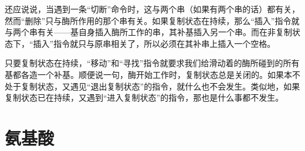还应说说，当遇到一条“切断”命令时，这与两个串（如果有两个串的话）都有关，然而“删除”只与酶所作用的那个串有关。如果复制状态在持续，那么“插入”指令就与两个串有关——基自身插入酶所工作的串，其补基插入另一个串。而在非复制状态下，“插入”指令就只与原串相关了，所以必须在其补串上插入一个空格。

只要复制状态在持续，“移动”和“寻找”指令就要求我们给滑动着的酶所碰到的所有基都各造一个补基。顺便说一句，酶开始工作时，复制状态总是关闭的。如果本不处于复制状态，又遇见“退出复制状态”的指令，就什么也不会发生。类似地，如果复制状态已在持续，又遇到“进入复制状态”的指令，那也是什么事都不发生。

\section{氨基酸}


